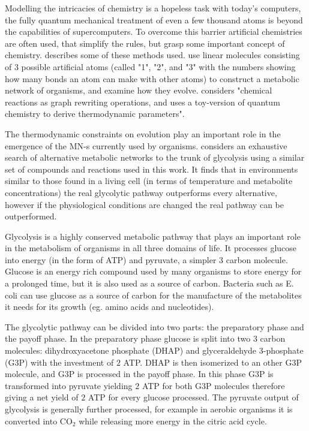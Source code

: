 \documentclass[a4paper,12pt]{article}
\begin{document}
	Modelling the intricacies of chemistry is a hopeless task with today's computers, the fully quantum mechanical treatment of even a few thousand atoms is beyond the capabilities of supercomputers. To overcome this barrier artificial chemistries are often used, that simplify the rules, but grasp some important concept of chemistry. \cite{artificialreview} describes some of these methods used. \cite{evolutioncomplex} use linear molecules consisting of 3 possible  artificial atoms (called "1", "2", and "3" with the numbers showing how many bonds an atom can make with other atoms) to construct a metabolic network of organisms, and examine how they evolve. \cite{computationalframework} considers "chemical reactions as graph rewriting operations, and uses a toy-version of quantum chemistry to derive thermodynamic parameters". %
	
	The thermodynamic constraints on evolution play an important role in the emergence of the MN-s currently used by organisms. \cite{BartekLower} considers an exhaustive search of alternative metabolic networks to the trunk of glycolysis using a similar set of compounds and reactions used in this work. It finds that in environments similar to those found in a living cell (in terms of temperature and metabolite concentrations) the real glycolytic pathway outperforms every alternative, however if the physiological conditions are changed the real pathway can be outperformed.


	

Glycolysis is a highly conserved metabolic pathway that plays an important role in the metabolism of organisms in all three domains of life. It processes glucose into energy (in the form of ATP) and pyruvate, a simpler 3 carbon molecule. Glucose is an energy rich compound used by many organisms to store energy for a prolonged time, but it is also used as a source of carbon. Bacteria such as E. coli can use glucose as a source of carbon for the manufacture of the metabolites it needs for its growth (eg. amino acids and nucleotides). \cite[]{principlesofbio} 

The glycolytic pathway can be divided into two parts: the preparatory phase and the payoff phase. In the preparatory phase glucose is split into two $3$ carbon molecules: dihydroxyacetone phosphate (DHAP) and glyceraldehyde 3-phosphate (G3P) with the investment of $2$ ATP. DHAP is then isomerized to an other G3P molecule, and G3P is processed in the payoff phase. In this phase G3P is transformed into pyruvate yielding $2$ ATP for both G3P molecules therefore giving a net yield of $2$ ATP for every glucose processed. The pyruvate output of glycolysis is generally further processed, for example in aerobic organisms it is converted into CO$_2$ while releasing more energy in the citric acid cycle. 
\end{document}
